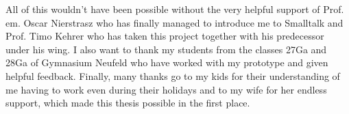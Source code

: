 All of this wouldn't have been possible without the very helpful support of Prof.\,em. Oscar Nierstrasz who has finally managed to introduce me to Smalltalk and Prof. Timo Kehrer who has taken this project together with his predecessor under his wing. I also want to thank my students from the classes 27Ga and 28Ga of Gymnasium Neufeld who have worked with my prototype and given helpful feedback. Finally, many thanks go to my kids for their understanding of me having to work even during their holidays and to my wife for her endless support, which made this thesis possible in the first place.
